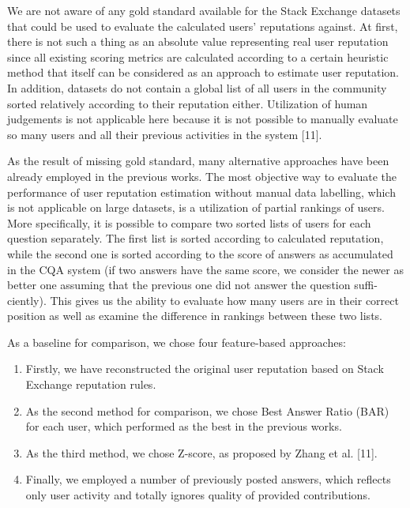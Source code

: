 \documentclass{llncs}
\begin{document}
			We are not aware of any gold standard available for the Stack Exchange
			datasets that could be used to evaluate the calculated users’ reputations against.
			At first, there is not such a thing as an absolute value representing real user
			reputation since all existing scoring metrics are calculated according to a certain
			heuristic method that itself can be considered as an approach to estimate user
			reputation. In addition, datasets do not contain a global list of all users in the
			community sorted relatively according to their reputation either. Utilization of
			human judgements is not applicable here because it is not possible to manually
			evaluate so many users and all their previous activities in the system [11].
			
			As the result of missing gold standard, many alternative approaches have
			been already employed in the previous works. The most objective way to evaluate
			the performance of user reputation estimation without manual data labelling,
			which is not applicable on large datasets, is a utilization of partial rankings of
			users. More specifically, it is possible to compare two sorted lists of users for each
			question separately. The first list is sorted according to calculated reputation,
			while the second one is sorted according to the score of answers as accumulated
			in the CQA system (if two answers have the same score, we consider the newer
			as better one assuming that the previous one did not answer the question suffi-
			ciently). This gives us the ability to evaluate how many users are in their correct
			position as well as examine the difference in rankings between these two lists.

			As a baseline for comparison, we chose four feature-based approaches:

	
		\begin{enumerate}
			\item Firstly, we have reconstructed the original user reputation based on Stack
			Exchange reputation rules.
			\item As the second method for comparison, we chose Best Answer Ratio (BAR)
			for each user, which performed as the best in the previous works.
			\item  As the third method, we chose Z-score, as proposed by Zhang et al. [11].
			\item Finally, we employed a number of previously posted answers, which reflects
			only user activity and totally ignores quality of provided contributions.
		\end{enumerate}
		
\end{document}
